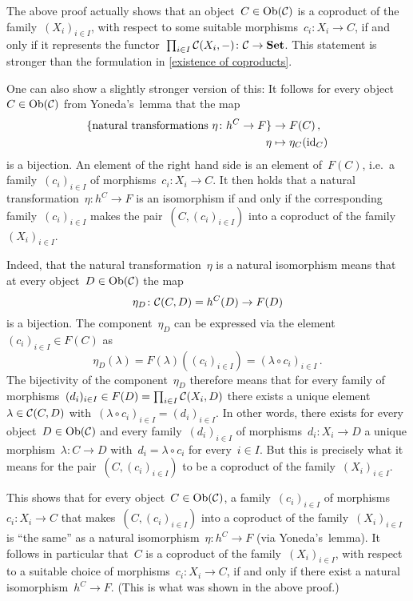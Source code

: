 \begin{remark*}
  The above proof actually shows that an object~$C \in \operatorname{Ob}(\mathcal{C})$ is a coproduct of the family~$(X_i)_{i \in I}$, with respect to some suitable morphisms~$c_i \colon X_i \to C$, if and only if it represents the functor~$\prod_{i \in I} \mathcal{C}(X_i, -) \colon \mathcal{C} \to \mathbf{Set}$.
  This statement is stronger than the formulation in \cref{existence of coproducts}.
  
  One can also show a slightly stronger version of this:
  It follows for every object~$C \in \operatorname{Ob}(\mathcal{C})$ from Yoneda’s~lemma that the map
  \begin{align*}
              \{ \text{natural transformations~$\eta \colon h^C \to F$} \}
    &\to      F(C) \,,
    \\
              \eta
    &\mapsto  \eta_C(\operatorname{id}_C)
  \end{align*}
  is a bijection.
  An element of the right hand side is an element of~$F(C)$, i.e.\ a family~$(c_i)_{i \in I}$ of morphisms~$c_i \colon X_i \to C$.
  It then holds that a natural transformation~$\eta \colon h^C \to F$ is an isomorphism if and only if the corresponding family~$(c_i)_{i \in I}$ makes the pair~$(C, (c_i)_{i \in I})$ into a coproduct of the family~$(X_i)_{i \in I}$.
  
  Indeed, that the natural transformation~$\eta$ is a natural isomorphism means that at every object~$D \in \operatorname{Ob}(\mathcal{C})$ the map
  \[
            \eta_D
    \colon  \mathcal{C}(C,D)
    =       h^C(D)
    \to     F(D)
  \]
  is a bijection.
  The component~$\eta_D$ can be expressed via the element~$(c_i)_{i \in I} \in F(C)$ as
  \[
      \eta_D(\lambda)
    = F(\lambda)( (c_i)_{i \in I} )
    = (\lambda \circ c_i)_{i \in I} \,.
  \]
  The bijectivity of the component~$\eta_D$ therefore means that for every family of morphisms~$(d_i)_{i \in I} \in F(D) = \prod_{i \in I} \mathcal{C}(X_i, D)$ there exists a unique element~$\lambda \in \mathcal{C}(C, D)$ with~$(\lambda \circ c_i)_{i \in I} = (d_i)_{i \in I}$.
  In other words, there exists for every object~$D \in \operatorname{Ob}(\mathcal{C})$ and every family~$(d_i)_{i \in I}$ of morphisms~$d_i \colon X_i \to D$ a unique morphism~$\lambda \colon C \to D$ with~$d_i = \lambda \circ c_i$ for every~$i \in I$.
  But this is precisely what it means for the pair~$(C, (c_i)_{i \in I})$ to be a coproduct of the family~$(X_i)_{i \in I}$.
  
  This shows that for every object~$C \in \operatorname{Ob}(\mathcal{C})$, a family~$(c_i)_{i \in I}$ of morphisms~$c_i \colon X_i \to C$ that makes~$(C, (c_i)_{i \in I})$ into a coproduct of the family~$(X_i)_{i \in I}$ is \enquote{the same} as a natural isomorphism~$\eta \colon h^C \to F$ (via Yoneda’s~lemma).
  It follows in particular that~$C$ is a coproduct of the family~$(X_i)_{i \in I}$, with respect to a suitable choice of morphisms~$c_i \colon X_i \to C$, if and only if there exist a natural isomorphism~$h^C \to F$.
  (This is what was shown in the above proof.)
\end{remark*}



